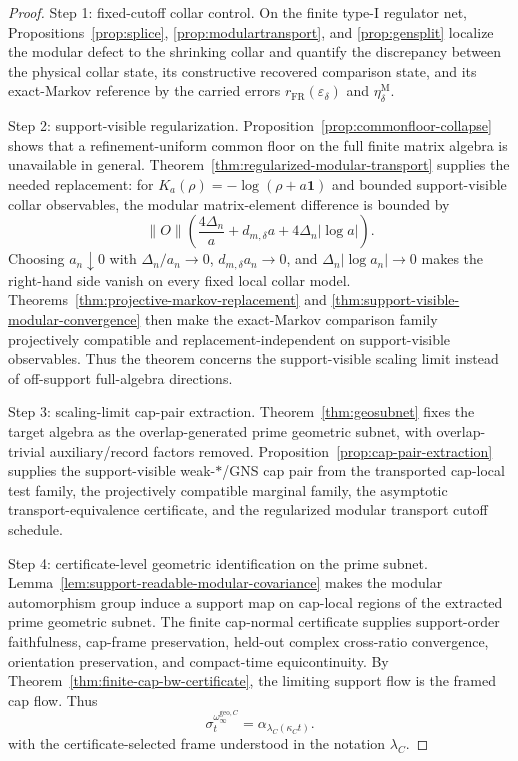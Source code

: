 \documentclass[11pt]{article}
\begin{document}
\begin{proof}
Step 1: fixed-cutoff collar control. On the finite type-I regulator net, Propositions~\ref{prop:splice}, \ref{prop:modulartransport}, and \ref{prop:gensplit} localize the modular defect to the shrinking collar and quantify the discrepancy between the physical collar state, its constructive recovered comparison state, and its exact-Markov reference by the carried errors \(r_{\mathrm{FR}}(\varepsilon_\delta)\) and \(\eta_\delta^{\mathrm M}\).

Step 2: support-visible regularization. Proposition~\ref{prop:commonfloor-collapse} shows that a refinement-uniform common floor on the full finite matrix algebra is unavailable in general. Theorem~\ref{thm:regularized-modular-transport} supplies the needed replacement: for \(K_a(\rho)=-\log(\rho+a\mathbf1)\) and bounded support-visible collar observables, the modular matrix-element difference is bounded by
\[
\|O\|\left(\frac{4\Delta_n}{a}+d_{m,\delta}a+4\Delta_n|\log a|\right).
\]
Choosing \(a_n\downarrow0\) with \(\Delta_n/a_n\to0\), \(d_{m,\delta}a_n\to0\), and \(\Delta_n|\log a_n|\to0\) makes the right-hand side vanish on every fixed local collar model. Theorems~\ref{thm:projective-markov-replacement} and \ref{thm:support-visible-modular-convergence} then make the exact-Markov comparison family projectively compatible and replacement-independent on support-visible observables. Thus the theorem concerns the support-visible scaling limit instead of off-support full-algebra directions.

Step 3: scaling-limit cap-pair extraction. Theorem~\ref{thm:geosubnet} fixes the target algebra as the overlap-generated prime geometric subnet, with overlap-trivial auxiliary/record factors removed. Proposition~\ref{prop:cap-pair-extraction} supplies the support-visible weak-\(*\)/GNS cap pair from the transported cap-local test family, the projectively compatible marginal family, the asymptotic transport-equivalence certificate, and the regularized modular transport cutoff schedule.

Step 4: certificate-level geometric identification on the prime subnet. Lemma~\ref{lem:support-readable-modular-covariance} makes the modular automorphism group induce a support map on cap-local regions of the extracted prime geometric subnet. The finite cap-normal certificate supplies support-order faithfulness, cap-frame preservation, held-out complex cross-ratio convergence, orientation preservation, and compact-time equicontinuity. By Theorem~\ref{thm:finite-cap-bw-certificate}, the limiting support flow is the framed cap flow. Thus
\[
\sigma_t^{\omega_\infty^{\mathrm{geo},C}}=\alpha_{\lambda_C(\kappa_C t)}.
\]
with the certificate-selected frame understood in the notation \(\lambda_C\).


\end{proof}
\end{document}
